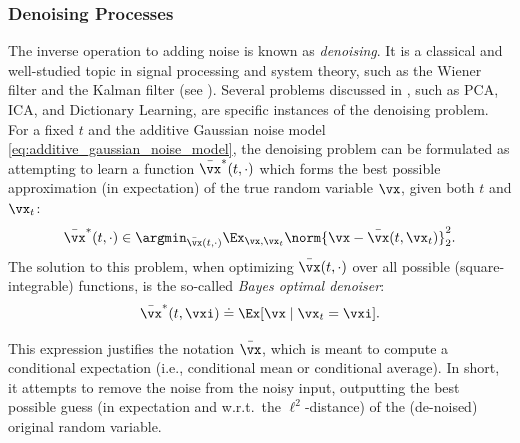 \documentclass[../../book-main.tex]{subfiles}
\begin{document}
\subsubsection{Denoising Processes}
The inverse operation to adding noise is known as \textit{denoising}. It is a classical and well-studied topic in signal processing and system theory, such as the Wiener filter and the Kalman filter (see ). Several problems discussed in , such as PCA, ICA, and Dictionary Learning, are specific instances of the denoising problem. For a fixed \(t\) and the additive Gaussian noise model \eqref{eq:additive_gaussian_noise_model}, the denoising problem can be formulated as attempting to learn a function \(\bar{\vx}^{\ast}(t, \cdot)\) which forms the best possible approximation (in expectation) of the true random variable \(\vx\), given both \(t\) and \(\vx_{t}\):
\begin{equation}\label{eq:denoising_loss}
	\bar{\vx}^{\ast}(t, \cdot) \in \argmin_{\bar{\vx}(t, \cdot)}\Ex_{\vx, \vx_{t}}\norm{\vx - \bar{\vx}(t, \vx_{t})}_{2}^{2}.
\end{equation}
The solution to this problem, when optimizing \(\bar{\vx}(t, \cdot)\) over all possible (square-integrable) functions, is the so-called \textit{Bayes optimal denoiser}: 
\begin{equation}\label{eq:optimal_denoiser}
	\bar{\vx}^{\ast}(t, \vxi) \doteq \Ex[\vx \mid \vx_{t} = \vxi].
\end{equation}

This expression justifies the notation \(\bar{\vx}\), which is meant to compute a conditional expectation (i.e., conditional mean or conditional average). In short, it attempts to remove the noise from the noisy input, outputting the best possible guess (in expectation and w.r.t.~the \(\ell^{2}\)-distance) of the (de-noised) original random variable.
\end{document}
